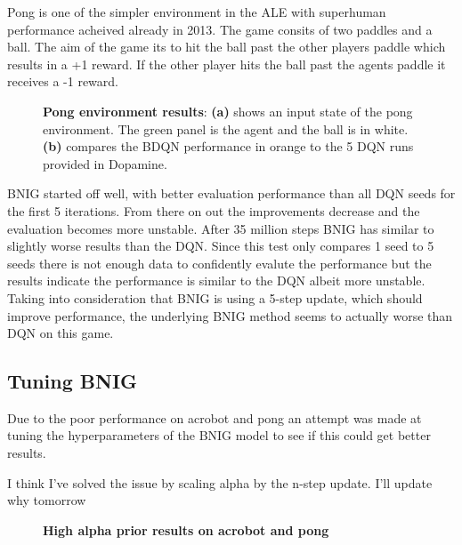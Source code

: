 Pong is one of the simpler environment in the ALE with superhuman performance acheived already in 2013\citep{mnih_2013}. The game consits of two paddles and a ball. The aim of the game its to hit the ball past the other players paddle which results in a +1 reward. If the other player hits the ball past the agents paddle it receives a -1 reward. 

\begin{figure}[H]
    \caption{\textbf{Pong environment results}: \textbf{(a)} shows an input state of the pong environment\citep{gym_docs}. The green panel is the agent and the ball is in white. \textbf{(b)} compares the BDQN performance in orange to the 5 DQN runs provided in Dopamine.}
    \label{fig:nn_pong}
\end{figure}

BNIG started off well, with better evaluation performance than all DQN seeds for the first 5 iterations. From there on out the improvements decrease and the evaluation becomes more unstable. After 35 million steps BNIG has similar to slightly worse results than the DQN. Since this test only compares 1 seed to 5 seeds there is not enough data to confidently evalute the performance but the results indicate the performance is similar to the DQN albeit more unstable. Taking into consideration that BNIG is using a 5-step update, which should improve performance, the underlying BNIG method seems to actually worse than DQN on this game.

\subsection{Tuning BNIG}

Due to the poor performance on acrobot and pong an attempt was made at tuning the hyperparameters of the BNIG model to see if this could get better results.

\todo I think I've solved the issue by scaling alpha by the n-step update. I'll update why tomorrow
\begin{figure}[H]
    \centering
    \caption{\textbf{High alpha prior results on acrobot and pong}}
    \label{fig:nn_acrobot}
\end{figure}

\cleardoublepage